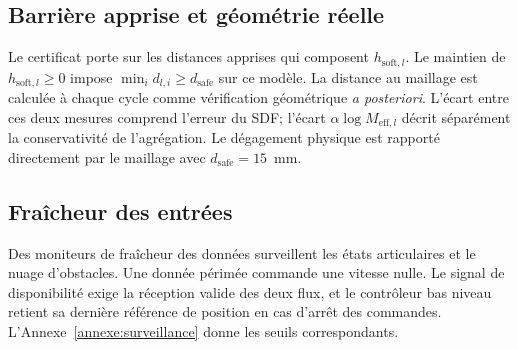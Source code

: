 \subsection{Barrière apprise et géométrie réelle}
Le certificat porte sur les distances apprises qui composent $h_{\mathrm{soft},l}$. Le maintien de $h_{\mathrm{soft},l}\geq0$ impose $\min_i d_{l,i}\geq d_{\mathrm{safe}}$ sur ce modèle. La distance au maillage est calculée à chaque cycle comme vérification géométrique \textit{a posteriori}. L'écart entre ces deux mesures comprend l'erreur du \ac{SDF}; l'écart $\alpha\log M_{\mathrm{eff},l}$ décrit séparément la conservativité de l'agrégation. Le dégagement physique est rapporté directement par le maillage avec $d_{\mathrm{safe}}=15$~mm.

\subsection{Fraîcheur des entrées}
Des moniteurs de fraîcheur des données surveillent les états articulaires et le nuage d'obstacles. Une donnée périmée commande une vitesse nulle. Le signal de disponibilité exige la réception valide des deux flux, et le contrôleur bas niveau retient sa dernière référence de position en cas d'arrêt des commandes. L'Annexe~\ref{annexe:surveillance} donne les seuils correspondants.
